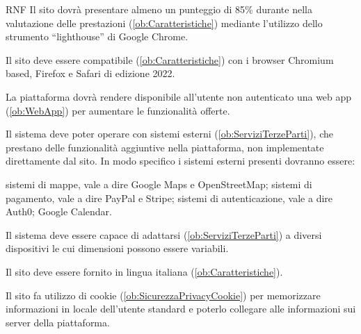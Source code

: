 \begin{listaPersonale}{RNF}
       Il sito dovrà presentare almeno un punteggio di 85\% durante nella valutazione delle prestazioni (\ref{ob:Caratteristiche}) mediante l'utilizzo dello strumento “lighthouse” di Google Chrome.

       Il sito deve essere compatibile (\ref{ob:Caratteristiche}) con i browser Chromium based, Firefox e Safari di edizione 2022.

       La piattaforma dovrà rendere disponibile all'utente non autenticato una web app (\ref{ob:WebApp}) per aumentare le funzionalità offerte.

       Il sistema deve poter operare con sistemi esterni (\ref{ob:ServiziTerzeParti}), che prestano delle funzionalità aggiuntive nella piattaforma, non implementate direttamente dal sito. In modo specifico i sistemi esterni presenti dovranno essere:
      \begin{listaPersonale2}[RNF]{}
             sistemi di mappe, vale a dire Google Maps e OpenStreetMap;
             sistemi di pagamento, vale a dire PayPal e Stripe;
             sistemi di autenticazione, vale a dire Auth0; %
             Google Calendar.
      \end{listaPersonale2}

       Il sistema deve essere capace di adattarsi (\ref{ob:ServiziTerzeParti}) a diversi dispositivi le cui dimensioni possono essere variabili.

       Il sito deve essere fornito in lingua italiana (\ref{ob:Caratteristiche}).

       Il sito fa utilizzo di cookie (\ref{ob:SicurezzaPrivacyCookie}) per memorizzare informazioni in locale dell'utente standard e poterlo collegare alle informazioni sui server della piattaforma.
\end{listaPersonale}